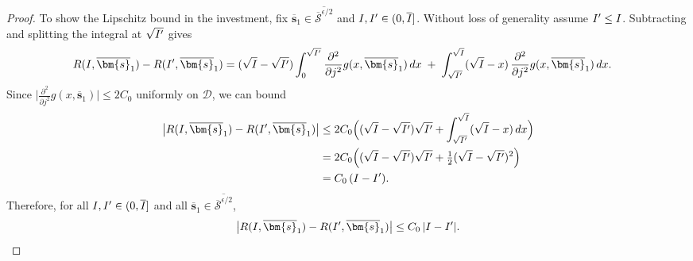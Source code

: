 \begin{proof}
  To show the Lipschitz bound in the investment, fix $\overline{\bm{s}}_1\in\overline{\overline{\mathcal{S}}^{\epsilon/2}}$ and $I,I'\in(0,\overline{I}]$.
  Without loss of generality assume $I'\le I$.
  Subtracting and splitting the integral at $\sqrt{I'}$ gives
  \begin{align*}
    R(\invst,\overline{\bm{s}}_1)-R(\invst',\overline{\bm{s}}_1)
    &=
    (\sqrt{\invst}-\sqrt{\invst'})\int_0^{\sqrt{\invst'}}\frac{\partial^2}{\partial
    j^2}g(x,\overline{\bm{s}}_1)\,dx
    \;+\;
    \int_{\sqrt{\invst'}}^{\sqrt{\invst}}(\sqrt{\invst}-x)\,\frac{\partial^2}{\partial
    j^2}g(x,\overline{\bm{s}}_1)\,dx.
  \end{align*}
  Since $\big|\frac{\partial^2}{\partial j^2}g(x,\overline{\bm{s}}_1)\big|\le 2C_0$ uniformly on $\mathcal{D}$, we can bound
  \begin{align*}
    \big|R(\invst,\overline{\bm{s}}_1)-R(\invst',\overline{\bm{s}}_1)\big|
    &\le
    2C_0\Big((\sqrt{\invst}-\sqrt{\invst'})\sqrt{\invst'}+\int_{\sqrt{\invst'}}^{\sqrt{\invst}}(\sqrt{\invst}-x)\,dx\Big)
    \\
    &=
    2C_0\Big((\sqrt{\invst}-\sqrt{\invst'})\sqrt{\invst'}+\tfrac{1}{2}(\sqrt{\invst}-\sqrt{\invst'})^2\Big)
    \\
    &=
    C_0\,(\invst-\invst').
  \end{align*}
  Therefore, for all $I,I'\in(0,\overline{I}]$ and all $\overline{\bm{s}}_1\in\overline{\overline{\mathcal{S}}^{\epsilon/2}}$,
  \[
    \big|R(\invst,\overline{\bm{s}}_1)-R(\invst',\overline{\bm{s}}_1)\big|
    \le C_0\,|\invst-\invst'|.
  \]


\end{proof}
